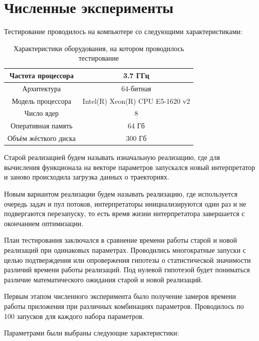 \section*{Численные эксперименты}

Тестирование проводилось на компьютере со следующими характеристиками:

\begin{table}[h]
\centering
\begin{tabular}{| c | c |}
    \hline
    Частота процессора & 3.7 ГГц \\ \hline
    Архитектура & 64-битная \\ \hline
    Модель процессора & Intel(R) Xeon(R) CPU E5-1620 v2 \\ \hline
    Число ядер & 8 \\ \hline
    Оперативная память & 64 Гб \\ \hline
    Объём жёсткого диска & 300 Гб \\
    \hline
\end{tabular}
\caption{Характеристики оборудования,
на котором проводилось тестирование}
\end{table}

Старой реализацией будем называть
изначальную реализацию,
где для вычисления функционала
на векторе параметров запускался
новый интерпретатор и
заново происходила загрузка
данных о траекториях.

Новым вариантом реализации
будем называть реализацию,
где используется очередь задач
и пул потоков,
интерпретаторы инициализируются
один раз и не подвергаются перезапуску,
то есть время жизни интерпретатора
завершается с окончанием оптимизации.

План тестирования заключался
в сравнение времени работы
старой и новой реализаций
при одинаковых параметрах.
Проводились многократные запуски
с целью подтверждения или опровержения
гипотезы о статистической значимости различий
времени работы реализаций.
Под нулевой гипотезой будет пониматься
различие математического ожидания
старой и новой реализаций.

Первым этапом численного эксперимента
было получение замеров времени
работы приложения
при различных комбинациях параметров.
Проводилось по 100 запусков
для каждого набора параметров.

Параметрами были выбраны следующие характеристики:

